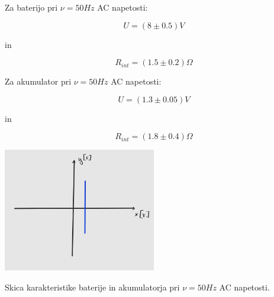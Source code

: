 \documentclass[12pt]{report}
\begin{document}
Za baterijo pri $\nu = 50\si{Hz}$ AC napetosti: 

\[
  U = (8 \pm 0.5)\si{V}  
\]

in 

\[
  R_{int} = (1.5 \pm 0.2)\Omega  
\]

Za akumulator pri $\nu = 50 \si{Hz}$ AC napetosti: 

\[
  U = (1.3 \pm 0.05)\si{V}  
\]

in 

\[
  R_{int} = (1.8 \pm 0.4)\Omega  
\]


\begin{slika}[H]
  \centering
  \includegraphics[width=0.5\textwidth]{baterija}
  \caption{\small Skica karakteristike baterije in akumulatorja pri $\nu = 50\si{Hz}$ AC napetosti.}
\end{slika}
\end{document}

